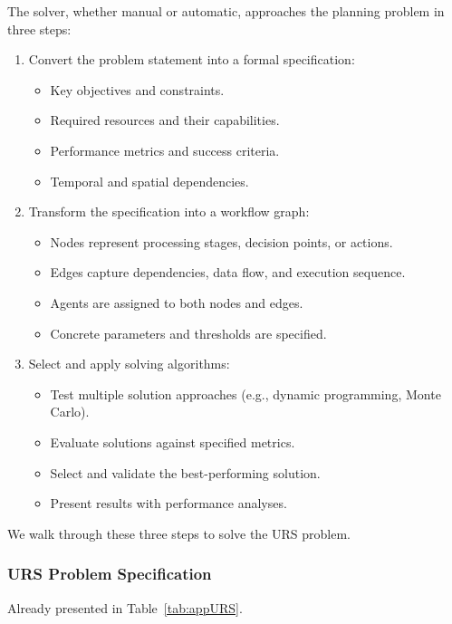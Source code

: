 The solver, whether manual or automatic, approaches the planning problem in three steps:
\begin{enumerate}[leftmargin=1.0em, topsep=-.0em, parsep=-.0em, label=\arabic*.]
    \item Convert the problem statement into a formal specification:
    \begin{itemize}[leftmargin=1em, topsep=-0em, parsep=-0em, label=-]
        \item Key objectives and constraints.
        \item Required resources and their capabilities.
        \item Performance metrics and success criteria.
        \item Temporal and spatial dependencies.
    \end{itemize}
    
    \item Transform the specification into a workflow graph:
    \begin{itemize}[leftmargin=1em, topsep=-0em, parsep=-0em, label=-]
        \item Nodes represent processing stages, decision points, or actions.
        \item Edges capture dependencies, data flow, and execution sequence.
        \item Agents are assigned to both nodes and edges.
        \item Concrete parameters and thresholds are specified.
    \end{itemize}
    
    \item Select and apply solving algorithms:
    \begin{itemize}[leftmargin=1em, topsep=0em, parsep=0em, label=-]
        \item Test multiple solution approaches (e.g., dynamic programming, Monte Carlo).
        \item Evaluate solutions against specified metrics.
        \item Select and validate the best-performing solution.
        \item Present results with performance analyses.
    \end{itemize}
\end{enumerate}

We walk through these three steps to solve the URS problem.

\subsubsection{URS Problem Specification}Already presented in Table~\ref{tab:appURS}.

